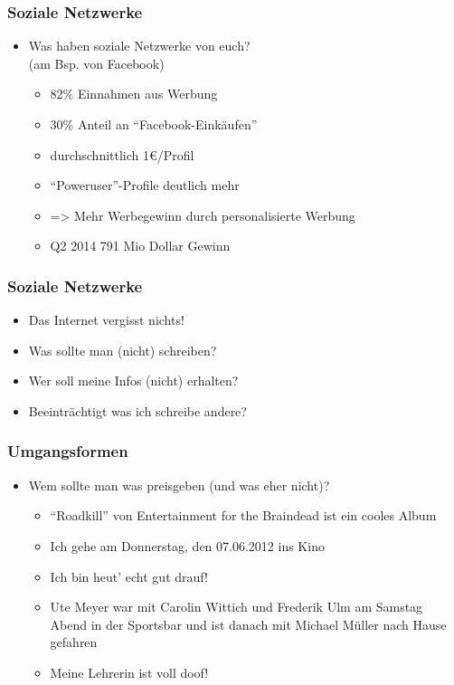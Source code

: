 \documentclass[12pt]{beamer}
\begin{document}
\begin{frame}
  \frametitle{Soziale Netzwerke}

  \begin{itemize}
    \item Was haben soziale Netzwerke von euch?\\(am Bsp. von Facebook)
      \begin{itemize}
        \item<2-> 82\% Einnahmen aus Werbung
        \item<3-> 30\% Anteil an "`Facebook-Einkäufen"'
        \item<4-> durchschnittlich 1€/Profil
        \item<5-> "`Poweruser"'-Profile deutlich mehr
        \item<6-> => Mehr Werbegewinn durch personalisierte Werbung
        \item<7-> Q2 2014 791 Mio Dollar Gewinn
      \end{itemize}
  \end{itemize}
\end{frame}

\begin{frame}
    \frametitle{Soziale Netzwerke}
    \begin{itemize}
        \item<2-> Das Internet vergisst nichts!
        \item<3-> Was sollte man (nicht) schreiben?
        \item<5-> Wer soll meine Infos (nicht) erhalten?
        \item<6-> Beeinträchtigt was ich schreibe andere?
    \end{itemize}
\end{frame}

\begin{frame}
  \frametitle{Umgangsformen}
  \begin{itemize}
    \item Wem sollte man was preisgeben (und was eher nicht)?
      \begin{itemize}
        \item<2-> "`Roadkill"' von Entertainment for the Braindead ist ein cooles Album
        \item<3-> Ich gehe am Donnerstag, den 07.06.2012 ins Kino
        \item<4-> Ich bin heut' echt gut drauf!
        \item<5-> Ute Meyer war mit Carolin Wittich und Frederik Ulm am Samstag Abend in der Sportsbar und ist danach mit Michael Müller nach Hause gefahren
        \item<6-> Meine Lehrerin ist voll doof!
      \end{itemize}
  \end{itemize}
\end{frame}
\end{document}
